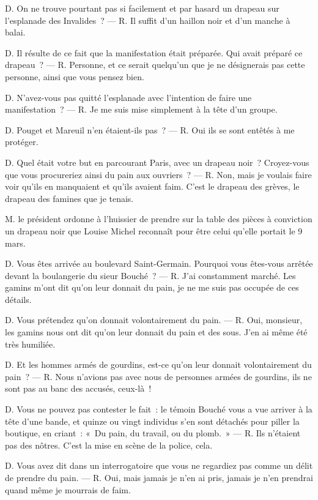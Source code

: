 \documentclass[french,twoside]{book} %
\begin{document}
D. On ne trouve pourtant pas si facilement et par hasard un drapeau sur l’esplanade des Invalides ? — R. Il suffit d’un haillon noir et d’un manche à balai.\par
 D. Il résulte de ce fait que la manifestation était préparée. Qui avait préparé ce drapeau ? — R. Personne, et ce serait quelqu’un que je ne désignerais pas cette personne, ainsi que vous pensez bien.\par
D. N’avez-vous pas quitté l’esplanade avec l’intention de faire une manifestation ? — R. Je me suis mise simplement à la tête d’un groupe.\par
D. Pouget et Mareuil n’en étaient-ils pas ? — R. Oui ils se sont entêtés à me protéger.\par
D. Quel était votre but en parcourant Paris, avec un drapeau noir ? Croyez-vous que vous procureriez ainsi du pain aux ouvriers ? — R. Non, mais je voulais faire voir qu’ils en manquaient et qu’ils avaient faim. C’est le drapeau des grèves, le drapeau des famines que je tenais.\par
\bigbreak
\noindent M. le président ordonne à l’huissier de prendre sur la table des pièces à conviction un drapeau noir que Louise Michel reconnaît pour être celui qu’elle portait le 9 mars.\par
\bigbreak
\noindent D. Vous êtes arrivée au boulevard Saint-Germain. Pourquoi vous êtes-vous arrêtée devant la boulangerie du sieur Bouché ? — R. J’ai constamment marché. Les gamins m’ont dit qu’on leur donnait du pain, je ne me suis pas occupée de ces détails.\par
D. Vous prétendez qu’on donnait volontairement du pain. — R. Oui, monsieur, les gamins nous ont dit qu’on leur donnait du pain et des sous. J’en ai même été très humiliée.\par
D. Et les hommes armés de gourdins, est-ce qu’on leur donnait volontairement du pain ? — R. Nous n’avions pas avec nous de personnes armées de gourdins, ils ne sont pas au banc des accusés, ceux-là !\par
D. Vous ne pouvez pas contester le fait : le témoin Bouché vous a vue arriver à la tête d’une bande, et quinze ou vingt individus s’en sont détachés pour piller la boutique, en criant : « Du pain, du travail, ou du plomb. » — R. Ils n’étaient pas des nôtres. C’est la mise en scène de la police, cela.\par
D. Vous avez dit dans un interrogatoire que vous ne regardiez pas comme un délit de prendre du pain. — R. Oui, mais jamais je n’en ai pris, jamais je n’en prendrai quand même je mourrais de faim.\par
\end{document}
